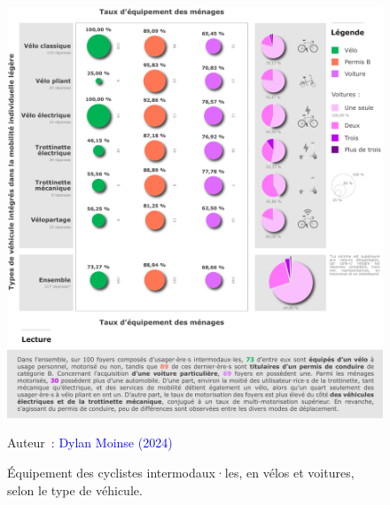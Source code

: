 \begin{refsegment}
    \begin{figure}[h!]\vspace*{4pt}
        \caption{Équipement des cyclistes intermodaux·les, en vélos et voitures, selon le type de véhicule.}
        \label{fig-chap4:equipement}
        \centerline{\includegraphics[width=1\columnwidth]{src/Figures/Chap-4/FR_Taux_motorisation.pdf}}
        \vspace{5pt}
        \begin{flushright}\scriptsize{
        Auteur~: \textcolor{blue}{Dylan Moinse (2024)}
        }\end{flushright}
    \end{figure}


\end{refsegment}
